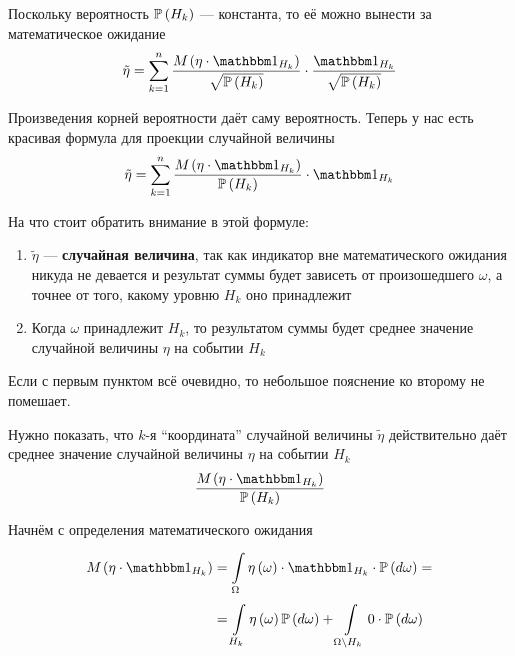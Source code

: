 Поскольку вероятность $\mathbb{P}\left( H_k \right)$ --- константа,
то её можно вынести за математическое ожидание
$$\tilde{\eta}
    = \sum_{k=1}^n
        \frac{\mean{\left( \eta \cdot \indicatorof{H_k} \right)}}
            {\sqrt{\probability{H_k}}}
        \cdot \frac{\indicatorof{H_k}}{\sqrt{\probability{H_k}}}$$

Произведения корней вероятности даёт саму вероятность.
Теперь у нас есть красивая формула для проекции случайной величины
\begin{equation}\label{discreteConditionalExpectation}
    \tilde{\eta} = \sum_{k=1}^n
        \frac{\mean{\left( \eta \cdot \indicatorof{H_k} \right)}}
            {\probability{H_k}}
        \cdot \indicatorof{H_k}
\end{equation}

На что стоит обратить внимание в этой формуле:
\begin{enumerate}
    \item $\tilde{\eta}$ --- \textbf{случайная величина},
        так как индикатор вне математического ожидания никуда не девается
        и результат суммы будет зависеть от произошедшего $\omega$,
        а точнее от того, какому уровню $H_k$ оно принадлежит
    \item Когда $\omega$ принадлежит $H_k$,
        то результатом суммы будет среднее значение случайной величины $\eta$
        на событии $H_k$
\end{enumerate}

Если с первым пунктом всё очевидно,
то небольшое пояснение ко второму не помешает.

Нужно показать, что $k$-я ``координата'' случайной величины $\tilde{\eta}$
действительно даёт среднее значение случайной величины $\eta$ на событии $H_k$
$$\frac{\mean{\left( \eta \cdot \indicatorof{H_k} \right)}}{\probability{H_k}}$$

Начнём с определения математического ожидания
\begin{equation}\label{meanIndicator}
    \begin{aligned}
    \mean{\left( \eta \cdot \indicatorof{H_k} \right)}
        &=\integralc{\Omega}{}{}{\probability{d\omega}}{
            \eta\left( \omega \right) \cdot \indicatorof{H_k}\cdot} =\\
        &=\integralc{H_k}{}{}{\probability{d\omega}}{
            \eta\left( \omega \right)}
            + \integralc{\Omega \setminus H_k}{}{}{
                \probability{d\omega}}{0 \cdot}
    \end{aligned}
\end{equation}

